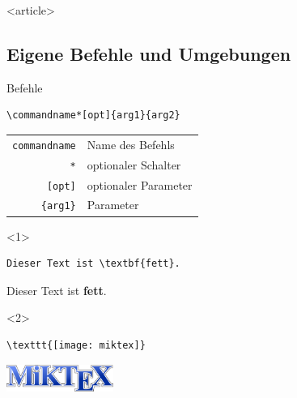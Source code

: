 \mode
<article>

\subsection{Eigene Befehle und Umgebungen}

\begin{Frame}[fragile, t]{Befehle}
  \xxx

  \begin{Definition}[Befehl]
    \begin{lstlisting}[gobble=6,style=block,morekeywords={commandname,commandname*}]
      \commandname*[opt]{arg1}{arg2}
    \end{lstlisting}

    \begin{tabular}{rl}
      \lstinline[morekeywords={commandname}]-commandname- & Name des Befehls \\
      \lstinline-*- & optionaler Schalter \\
      \lstinline-[opt]- & optionaler Parameter \\
      \lstinline-{arg1}- & Parameter
    \end{tabular}
  \end{Definition}

  \xxx

  \begin{onlyenv}<1>
    \begin{Beispiel}[Befehl]
      \begin{lstlisting}[gobble=8,style=block]
        Dieser Text ist \textbf{fett}.
      \end{lstlisting}
      Dieser Text ist \textbf{fett}.
    \end{Beispiel}
  \end{onlyenv}

  \begin{onlyenv}<2>
    \begin{Beispiel}
      \begin{lstlisting}[gobble=8,style=block]
        \texttt{[image: miktex]}
      \end{lstlisting}
      \includegraphics[width=3.5cm]{images/miktex}
    \end{Beispiel}
  \end{onlyenv}
\end{Frame}

